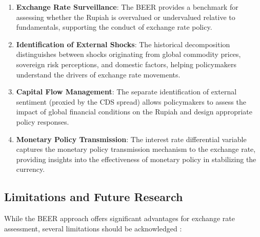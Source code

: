 \documentclass[11pt,a4paper]{article}
\begin{document}
\begin{enumerate}[label=\textbf{\arabic*.}]
    \item \textbf{Exchange Rate Surveillance}: The BEER provides a benchmark for assessing whether the Rupiah is overvalued or undervalued relative to fundamentals, supporting the conduct of exchange rate policy.
    
    \item \textbf{Identification of External Shocks}: The historical decomposition distinguishes between shocks originating from global commodity prices, sovereign risk perceptions, and domestic factors, helping policymakers understand the drivers of exchange rate movements.
    
    \item \textbf{Capital Flow Management}: The separate identification of external sentiment (proxied by the CDS spread) allows policymakers to assess the impact of global financial conditions on the Rupiah and design appropriate policy responses.
    
    \item \textbf{Monetary Policy Transmission}: The interest rate differential variable captures the monetary policy transmission mechanism to the exchange rate, providing insights into the effectiveness of monetary policy in stabilizing the currency.
\end{enumerate}

\subsection{Limitations and Future Research}

While the BEER approach offers significant advantages for exchange rate assessment, several limitations should be acknowledged \citep{ClarkMacDonald1998}:
\end{document}
